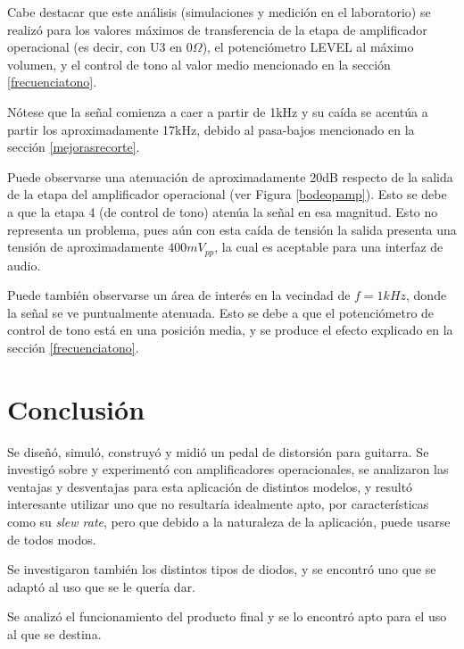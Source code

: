 Cabe destacar que este análisis (simulaciones y medición en el laboratorio) se realizó para los valores máximos de transferencia de la etapa de amplificador operacional (es decir, con U3 en $0\Omega$), el potenciómetro LEVEL al máximo volumen, y el control de tono al valor medio mencionado en la sección \ref{frecuenciatono}.

Nótese que la señal comienza a caer a partir de 1kHz y su caída se acentúa a partir los aproximadamente 17kHz, debido al pasa-bajos mencionado en la sección \ref{mejorasrecorte}.

Puede observarse una atenuación de aproximadamente 20dB respecto de la salida de la etapa del amplificador operacional (ver Figura \ref{bodeopamp}). Esto se debe a que la etapa 4 (de control de tono) atenúa la señal en esa magnitud. Esto no representa un problema, pues aún con esta caída de tensión la salida presenta una tensión de aproximadamente $400mV_{pp}$, la cual es aceptable para una interfaz de audio.

Puede también observarse un área de interés en la vecindad de $f=1kHz$, donde la señal se ve puntualmente atenuada. Esto se debe a que el potenciómetro de control de tono está en una posición media, y se produce el efecto explicado en la sección \ref{frecuenciatono}.

\section{Conclusión}
Se diseñó, simuló, construyó y midió un pedal de distorsión para guitarra. Se investigó sobre y experimentó con amplificadores operacionales, se analizaron las ventajas y desventajas para esta aplicación de distintos modelos, y resultó interesante utilizar uno que no resultaría idealmente apto, por características como su \emph{slew rate}, pero que debido a la naturaleza de la aplicación, puede usarse de todos modos.

Se investigaron también los distintos tipos de diodos, y se encontró uno que se adaptó al uso que se le quería dar.

Se analizó el funcionamiento del producto final y se lo encontró apto para el uso al que se destina.


